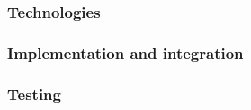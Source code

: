 \subsubsection{Technologies}



\subsubsection{Implementation and integration}


\subsubsection{Testing}